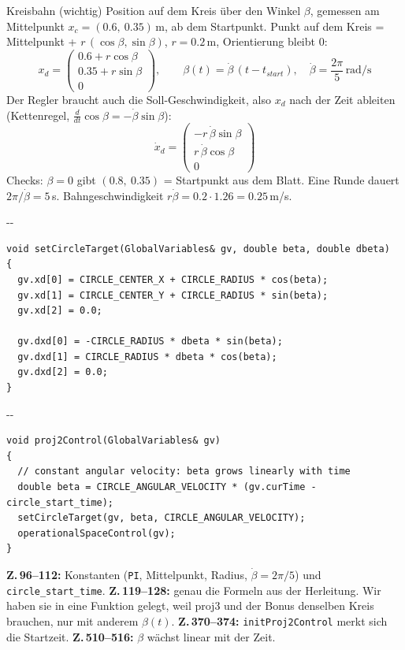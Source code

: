 \documentclass[10pt,a4paper]{article}
\makeatletter
\newcommand{\secneed}[1]{\par\penalty\@M\begingroup\setlength{\dimen@}{#1}\dimen@ii\pagegoal
  \advance\dimen@ii-\pagetotal\ifdim\dimen@>\dimen@ii\ifdim\dimen@ii>\z@\vfil\fi\penalty-\@M\fi\endgroup}
\newcommand{\code}[1]{\texttt{#1}}
\makeatother
\begin{document}
\begin{herleitung}{Kreisbahn (wichtig)}
Position auf dem Kreis über den Winkel $\beta$, gemessen am Mittelpunkt $x_{c} = (0.6,\ 0.35)$\,m, ab dem Startpunkt.
Punkt auf dem Kreis = Mittelpunkt + $r\,(\cos\beta, \sin\beta)$, $r = 0.2$\,m, Orientierung bleibt 0:
\[
  x_d = \begin{pmatrix} 0.6 + r\cos\beta \\ 0.35 + r\sin\beta \\ 0 \end{pmatrix},
  \qquad \beta(t) = \dot\beta\,(t - t_{start}),\quad \dot\beta = \frac{2\pi}{5}\,\text{rad/s}
\]
Der Regler braucht auch die Soll-Geschwindigkeit, also $x_d$ nach der Zeit ableiten (Kettenregel, $\frac{d}{dt}\cos\beta =
-\dot\beta\sin\beta$):
\[
  \dot x_d = \begin{pmatrix} -r\,\dot\beta\sin\beta \\ r\,\dot\beta\cos\beta \\ 0 \end{pmatrix}
\]
Checks: $\beta = 0$ gibt $(0.8,\ 0.35)$ = Startpunkt aus dem Blatt. Eine Runde dauert $2\pi/\dot\beta = 5$\,s.
Bahngeschwindigkeit $r\dot\beta = 0.2 \cdot 1.26 = 0.25$\,m/s.
\end{herleitung}

\secneed{10\baselineskip}
\begin{lstlisting}[firstnumber=119]
void setCircleTarget(GlobalVariables& gv, double beta, double dbeta)
{
  gv.xd[0] = CIRCLE_CENTER_X + CIRCLE_RADIUS * cos(beta);
  gv.xd[1] = CIRCLE_CENTER_Y + CIRCLE_RADIUS * sin(beta);
  gv.xd[2] = 0.0;

  gv.dxd[0] = -CIRCLE_RADIUS * dbeta * sin(beta);
  gv.dxd[1] = CIRCLE_RADIUS * dbeta * cos(beta);
  gv.dxd[2] = 0.0;
}
\end{lstlisting}
\vspace{-4pt}
\secneed{8\baselineskip}
\begin{lstlisting}[firstnumber=510]
void proj2Control(GlobalVariables& gv)
{
  // constant angular velocity: beta grows linearly with time
  double beta = CIRCLE_ANGULAR_VELOCITY * (gv.curTime - circle_start_time);
  setCircleTarget(gv, beta, CIRCLE_ANGULAR_VELOCITY);
  operationalSpaceControl(gv);
}
\end{lstlisting}
\textbf{Z.\,96--112:} Konstanten (\code{PI}, Mittelpunkt, Radius, $\dot\beta = 2\pi/5$) und \code{circle\_start\_time}.
\textbf{Z.\,119--128:} genau die Formeln aus der Herleitung. Wir haben sie in eine Funktion gelegt, weil proj3 und der Bonus
denselben Kreis brauchen, nur mit anderem $\beta(t)$. \textbf{Z.\,370--374:} \code{initProj2Control} merkt sich die
Startzeit. \textbf{Z.\,510--516:} $\beta$ wächst linear mit der Zeit.
\end{document}
